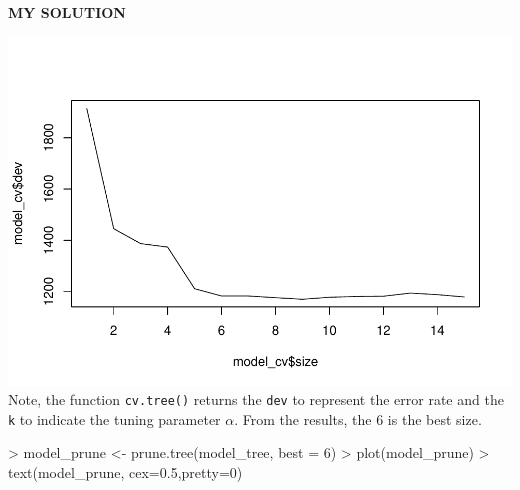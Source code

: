 \documentclass[
]{article}
\newenvironment{Shaded}{\begin{snugshade}}{\end{snugshade}}
\newcommand{\AttributeTok}[1]{\textcolor[rgb]{0.77,0.63,0.00}{#1}}
\newcommand{\CommentTok}[1]{\textcolor[rgb]{0.56,0.35,0.01}{\textit{#1}}}
\newcommand{\DecValTok}[1]{\textcolor[rgb]{0.00,0.00,0.81}{#1}}
\newcommand{\ErrorTok}[1]{\textcolor[rgb]{0.64,0.00,0.00}{\textbf{#1}}}
\newcommand{\FloatTok}[1]{\textcolor[rgb]{0.00,0.00,0.81}{#1}}
\newcommand{\FunctionTok}[1]{\textcolor[rgb]{0.00,0.00,0.00}{#1}}
\newcommand{\NormalTok}[1]{#1}
\newcommand{\OtherTok}[1]{\textcolor[rgb]{0.56,0.35,0.01}{#1}}
\newcommand{\SpecialCharTok}[1]{\textcolor[rgb]{0.00,0.00,0.00}{#1}}
\newcommand{\StringTok}[1]{\textcolor[rgb]{0.31,0.60,0.02}{#1}}
\begin{document}
\textbf{MY SOLUTION}

\begin{Shaded}
\end{Shaded}

\includegraphics{Homework_13_Pan_files/figure-latex/unnamed-chunk-5-1.pdf}
Note, the function \texttt{cv.tree()} returns the \texttt{dev} to
represent the error rate and the \texttt{k} to indicate the tuning
parameter \(\alpha\). From the results, the 6 is the best size.

\begin{Shaded}
\begin{Highlighting}[]
\SpecialCharTok{\textgreater{}}\NormalTok{ model\_prune }\OtherTok{\textless{}{-}} \FunctionTok{prune.tree}\NormalTok{(model\_tree, }\AttributeTok{best =} \DecValTok{6}\NormalTok{)}
\SpecialCharTok{\textgreater{}} \FunctionTok{plot}\NormalTok{(model\_prune)}
\SpecialCharTok{\textgreater{}} \FunctionTok{text}\NormalTok{(model\_prune, }\AttributeTok{cex=}\FloatTok{0.5}\NormalTok{,}\AttributeTok{pretty=}\DecValTok{0}\NormalTok{)}
\end{Highlighting}
\end{Shaded}
\end{document}
